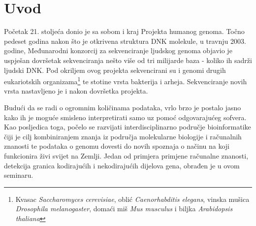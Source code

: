 \section*{Uvod}
\label{ch:intro}

Početak 21. stoljeća donio je sa sobom i kraj Projekta humanog genoma. Točno pedeset godina nakon što je otkrivena struktura DNK molekule\cite{Watson01}, u travnju 2003. godine, Međunarodni konzorcij za sekvenciranje ljudskog genoma objavio je uspješan dovršetak sekvenciranja nešto više od tri milijarde baza - koliko ih sadrži ljudski DNK. Pod okriljem ovog projekta sekvencirani su i genomi drugih eukariotskih organizama\footnote{Kvasac \textit{Saccharomyces cerevisiae}, oblić \textit{Caenorhabditis elegans}, vinska mušica \textit{Drosophila melanogaster}, domaći miš \textit{Mus musculus} i biljka \textit{Arabidopsis thaliana} } te stotine vrsta bakterija i arheja. Sekvenciranje novih vrsta nastavljeno je i nakon dovršetka projekta\cite{Cox01}. 
\par
Budući da se radi o ogromnim količinama podataka, vrlo brzo je postalo jasno kako ih je moguće smisleno interpretirati samo uz pomoć odgovarajućeg sofvera. Kao posljedica toga, počelo se razvijati interdisciplinarno područje bioinformatike čiji je cilj kombiniranjem znanja iz područja molekularne biologije i računalnih znanosti te podataka o genomu dovesti do novih spoznaja o načinu na koji funkcionira živi svijet na Zemlji. Jedan od primjera primjene računalne znanosti, detekcija granica kodirajućih i nekodirajućih dijelova gena, obrađen je u ovom seminaru.

